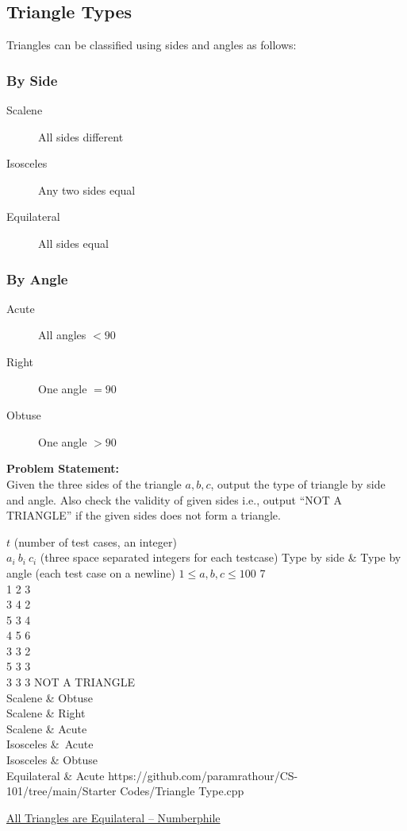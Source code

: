 \documentclass[../../Problems]{subfiles}
\begin{document}
\subsection{Triangle Types}{\label{pp:triangletypes}}
Triangles can be classified using sides and angles as follows:
\vspace{-0.5em}
\subsubsection{By Side}
\begin{description}
\item[Scalene] All sides different
\item[Isosceles] Any two sides equal
\item[Equilateral] All sides equal
\end{description}
\vspace{-0.5em}
\subsubsection{By Angle}
\begin{description}
\item[Acute] All angles $< 90$\textdegree
\item[Right] One angle $= 90$\textdegree
\item[Obtuse] One angle $> 90$\textdegree
\end{description}
\textbf{Problem Statement:}\\
Given the three sides of the triangle $a,b,c$, output the type of triangle by side and angle. Also check the validity of given sides i.e., output ``NOT A TRIANGLE'' if the given sides does not form a triangle.
\begin{testcases}
	{$t$ \hfill(number of test cases, an integer)\\
	$a_{i}\ b_{i}\ c_{i}$ \hfill(three space separated integers for each testcase)}
	{Type by side \& Type by angle \hfill{(each test case on a newline)}}
	{$1 \leq a,b,c \leq 100$}
	{7\\1 2 3\\3 4 2\\5 3 4\\4 5 6\\3 3 2\\5 3 3\\3 3 3}
	{NOT A TRIANGLE\\Scalene \& Obtuse\\Scalene \& Right\\Scalene \& Acute\\Isosceles \&\ Acute\\Isosceles \& Obtuse\\Equilateral \& Acute}
	{https://github.com/paramrathour/CS-101/tree/main/Starter Codes/Triangle Type.cpp}
\end{testcases}
\begin{funvideo}
\href{https://youtu.be/Yajonhixy4g}{All Triangles are Equilateral -- Numberphile}
\end{funvideo}
\end{document}

